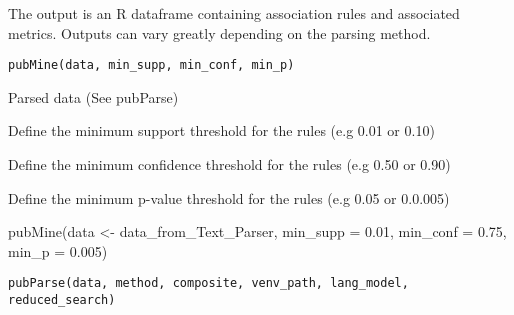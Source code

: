 \documentclass[a4paper]{book}
\begin{document}
%
\begin{Description}\relax
The output is an R dataframe containing association rules and associated metrics. Outputs can vary greatly depending on the parsing method.
\end{Description}
%
\begin{Usage}
\begin{verbatim}
pubMine(data, min_supp, min_conf, min_p)
\end{verbatim}
\end{Usage}
%
\begin{Arguments}
\begin{ldescription}
\item[\code{data}] Parsed data (See pubParse)

\item[\code{min\_supp}] Define the minimum support threshold for the rules (e.g 0.01 or 0.10)

\item[\code{min\_conf}] Define the minimum confidence threshold for the rules (e.g 0.50 or 0.90)

\item[\code{min\_p}] Define the minimum p-value threshold for the rules (e.g 0.05 or 0.0.005)
\end{ldescription}
\end{Arguments}
%
\begin{Examples}
\begin{ExampleCode}
pubMine(data <- data_from_Text_Parser, min_supp = 0.01, min_conf = 0.75, min_p = 0.005)
\end{ExampleCode}
\end{Examples}
%
\begin{Usage}
\begin{verbatim}
pubParse(data, method, composite, venv_path, lang_model, reduced_search)
\end{verbatim}
\end{Usage}
%
\end{document}
